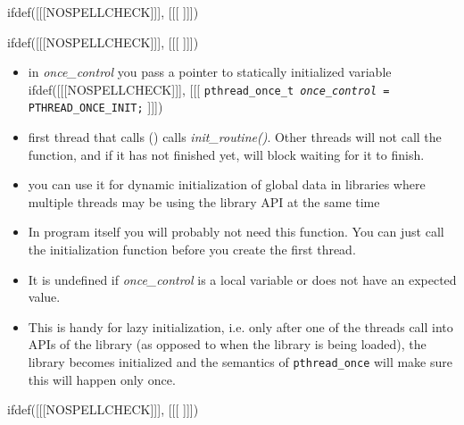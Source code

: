 
ifdef([[[NOSPELLCHECK]]], [[[
]]])

\begin{slide}
ifdef([[[NOSPELLCHECK]]], [[[
]]])
\begin{itemize}
\item in \emph{once\_control} you pass a pointer to statically initialized
variable
ifdef([[[NOSPELLCHECK]]], [[[
\texttt{pthread\_once\_t \emph{once\_control} = PTHREAD\_ONCE\_INIT;}
]]])
\item first thread that calls () calls
\emph{init\_routine()}.  Other threads will not call the function, and if it has
not finished yet, will block waiting for it to finish.
\item you can use it for dynamic initialization of global data in libraries
where multiple threads may be using the library API at the same time
\end{itemize}
\end{slide}

\begin{itemize}
\item In program itself you will probably not need this function.  You can
just call the initialization function before you create the first thread.
\item It is undefined if \emph{once\_control} is a local variable or does not
have an expected value.
\item This is handy for lazy initialization, i.e. only after one of the threads
call into APIs of the library (as opposed to when the library is being loaded),
the library becomes initialized and the semantics of \texttt{pthread\_once}
will make sure this will happen only once.
\end{itemize}


ifdef([[[NOSPELLCHECK]]], [[[
]]])

